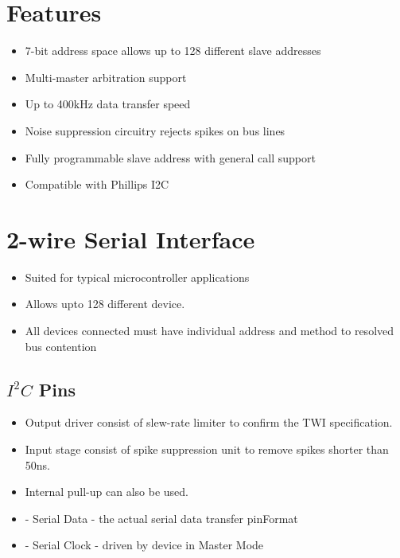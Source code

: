 \documentclass{article}
\begin{document}
\section{Features}
\begin{itemize}
    \item 7-bit address space allows up to 128 different slave addresses
    \item Multi-master arbitration support
    \item Up to 400kHz data transfer speed
    \item Noise suppression circuitry rejects spikes on bus lines
    \item Fully programmable slave address with general call support
    \item Compatible with Phillips I­2C
\end{itemize}
\section{2-wire Serial Interface}
\begin{itemize}
    \item Suited for typical microcontroller applications
    \item Allows upto  128 different device.
    \item All devices connected must have individual address and method to resolved bus contention
\end{itemize}

\subsection{\texorpdfstring{$I^2C$}{} Pins}
\begin{itemize}
    \item Output driver consist of slew-rate limiter to confirm the TWI specification.
    \item Input stage consist of spike suppression unit to remove spikes shorter than 50ns.
    \item Internal pull-up can also be used.
    \item {} - Serial Data - the actual serial data transfer pinFormat
    \item {} - Serial Clock - driven by device in Master Mode
\end{itemize}
\end{document}
